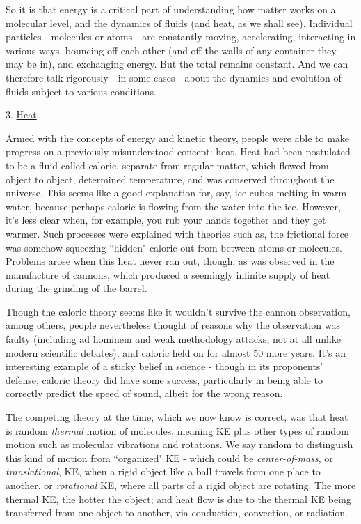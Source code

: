 \documentclass[12pt]{article}
\begin{document}
So it is that energy is a critical part of understanding how matter works on a molecular level, and the dynamics of fluids (and heat, as we shall see). Individual particles - molecules or atoms - are constantly moving, accelerating, interacting in various ways, bouncing off each other (and off the walls of any container they may be in), and exchanging energy. But the total remains constant. And we can therefore talk rigorously - in some cases - about the dynamics and evolution of fluids subject to various conditions. 

3. \underline{Heat}

Armed with the concepts of energy and kinetic theory, people were able to make progress on a previously misunderstood concept: heat. Heat had been postulated to be a fluid called caloric, separate from regular matter, which flowed from object to object, determined temperature, and was conserved throughout the universe. This seems like a good explanation for, say, ice cubes melting in warm water, because perhaps caloric is flowing from the water into the ice. However, it's less clear when, for example, you rub your hands together and they get warmer. Such processes were explained with theories such as, the frictional force was somehow squeezing ``hidden" caloric out from between atoms or molecules. Problems arose when this heat never ran out, though, as was observed in the manufacture of cannons, which produced a seemingly infinite supply of heat during the grinding of the barrel. 

Though the caloric theory seems like it wouldn't survive the cannon observation, among others, people nevertheless thought of reasons why the observation was faulty (including ad hominem and weak methodology attacks, not at all unlike modern scientific debates); and caloric held on for almost 50 more years. It's an interesting example of a sticky belief in science - though in its proponents' defense, caloric theory did have some success, particularly in being able to correctly predict the speed of sound, albeit for the wrong reason.

The competing theory at the time, which we now know is correct, was that heat is random \textit{thermal} motion of molecules, meaning KE plus other types of random motion such as molecular vibrations and rotations. We say random to distinguish this kind of motion from ``organized" KE - which could be \textit{center-of-mass}, or \textit{translational}, KE, when a rigid object like a ball travels from one place to another, or \textit{rotational} KE, where all parts of a rigid object are rotating. The more thermal KE, the hotter the object; and heat flow is due to the thermal KE being transferred from one object to another, via conduction, convection, or radiation. 
\end{document}
